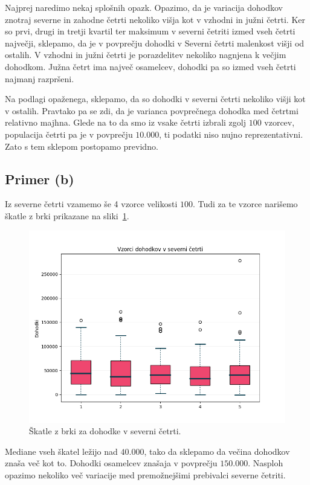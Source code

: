 \documentclass[a4paper,11pt]{article}
\begin{document}
Najprej naredimo nekaj splošnih opazk.
Opazimo, da je variacija dohodkov znotraj severne in zahodne četrti nekoliko višja kot v vzhodni in južni četrti. 
Ker so prvi, drugi in tretji kvartil ter maksimum v severni četriti izmed vseh četrti največji, 
sklepamo, da je v povprečju dohodki v Severni četrti malenkost višji od ostalih. 
V vzhodni in južni četrti je porazdelitev nekoliko nagnjena k večjim dohodkom. 
Južna četrt ima največ osamelcev, dohodki pa so izmed vseh četrti najmanj razpršeni.

Na podlagi opaženega, sklepamo, da so dohodki v severni četrti nekoliko višji kot v ostalih.
Pravtako pa se zdi, da je varianca povprečnega dohodka med četrtmi relativno majhna.
Glede na to da smo iz vsake četrti izbrali zgolj $100$ vzorcev, populacija četrti pa je v povprečju $10.000$, ti podatki niso nujno reprezentativni.
Zato s tem sklepom postopamo previdno.

\subsection*{Primer (b)}

Iz severne četrti vzamemo še 4 vzorce velikosti $100$.
Tudi za te vzorce narišemo škatle z brki prikazane na sliki~\ref{brke_sever}.

\begin{figure}[H]
    \centering
    \includegraphics[scale=0.5]{Skatle_z_brki_Sever.png}
    \caption{Škatle z brki za dohodke v severni četrti.}
    \label{brke_sever}
\end{figure}

Mediane vseh škatel ležijo nad $40.000$, tako da sklepamo da večina dohodkov znaša več kot to.
Dohodki osamelcev znašaja v povprečju $150.000$.
Nasploh opazimo nekoliko več variacije med premožnejšimi prebivalci severne četriti.
\end{document}
